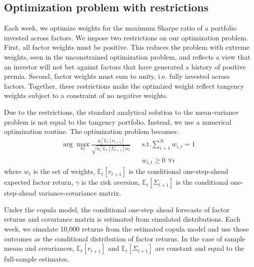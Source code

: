 \subsection{Optimization problem with restrictions}

Each week, we optimize weights for the maximum Sharpe ratio of a portfolio invested across factors. We impose two restrictions on our optimization problem. First, all factor weights must be positive. This reduces the problem with extreme weights, seen in the unconstrained optimization problem, and reflects a view that an investor will not bet against factors that have generated a history of positive premia. Second, factor weights must sum to unity, i.e. fully invested across factors. Together, these restrictions make the optimized weight reflect tangency weights subject to a constraint of no negative weights.


Due to the restrictions, the standard analytical solution to the mean-variance problem is not equal to the tangency portfolio. Instead, we use a numerical optimization routine. The optimization problem becomes:
\begin{align*}
  \arg\!\max_{w_t} \frac{w_t^\top \mathbb{E}_t[r_{t+1}]}{\sqrt{w_t^\top \mathbb{E}_t[\Sigma_{t+1}] w_t}}
    && \text{s.t.} \sum_{i=1}^N w_{i,t} = 1 \\
    && w_{i,t} \ge 0 \,\, \forall i
\end{align*}
where $w_t$ is the set of weights, $\mathbb{E}_t[r_{t+1}]$ is the conditional one-step-ahead expected factor return, $\gamma$ is the risk aversion, $\mathbb{E}_t[\Sigma_{t+1}]$ is the conditional one-step-ahead variance-covariance matrix. 

Under the copula model, the conditional one-step ahead forecasts of factor returns and covariance matrix is estimated from simulated distributions. Each week, we simulate 10,000 returns from the estimated copula model and use those outcomes as the conditional distribution of factor returns. In the case of sample means and covariances, $\mathbb{E}_t[r_{t+1}]$ and $\mathbb{E}_t[\Sigma_{t+1}]$ are constant and equal to the full-sample estimates.


